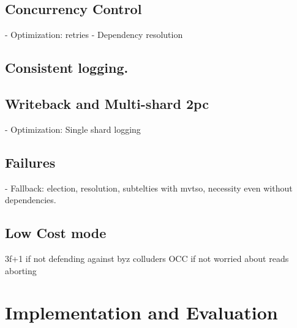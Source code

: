 \subsection{Concurrency Control}
 - Optimization: retries
 - Dependency resolution
\subsection{Consistent logging.}



\subsection{Writeback and Multi-shard 2pc}

- Optimization: Single shard logging
\subsection{Failures}
- Fallback: election, resolution, subtelties with mvtso, necessity even without dependencies.

\subsection{Low Cost mode}
3f+1 if not defending against byz colluders
OCC if not worried about reads aborting


\section{Implementation and Evaluation}


